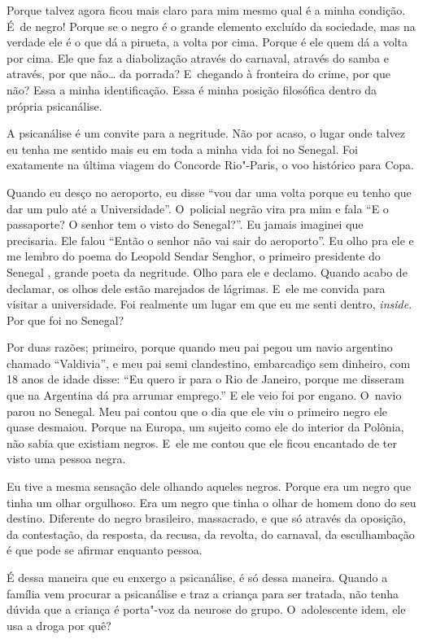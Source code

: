 Porque talvez agora ficou mais claro para mim mesmo qual é a minha
condição. É~de negro! Porque se o negro é o grande elemento excluído da
sociedade, mas na verdade ele é o que dá a pirueta, a volta por cima.
Porque é ele quem dá a volta por cima. Ele que faz a diabolização
através do carnaval, através do samba e através, por que não… da
porrada? E~chegando à fronteira do crime, por que não? Essa a minha
identificação. Essa é minha posição filosófica dentro da própria
psicanálise.

A psicanálise é um convite para a negritude. Não por acaso, o lugar onde
talvez eu tenha me sentido mais eu em toda a minha vida foi no Senegal.
Foi exatamente na última viagem do Concorde Rio"-Paris, o voo histórico
para Copa.

Quando eu desço no aeroporto, eu disse ``vou dar uma volta porque eu tenho
que dar um pulo até a Universidade''. O~policial negrão vira pra mim e
fala ``E o passaporte? O senhor tem o visto do Senegal?''. Eu jamais
imaginei que precisaria. Ele falou ``Então o senhor não vai sair do
aeroporto''. Eu olho pra ele e me lembro do poema do Leopold Sendar
Senghor, o primeiro presidente do Senegal , grande poeta da negritude.
Olho para ele e declamo. Quando acabo de declamar, os olhos dele estão
marejados de lágrimas. E~ele me convida para visitar a universidade. Foi
realmente um lugar em que eu me senti dentro, \emph{inside}. Por que foi
no Senegal?

Por duas razões; primeiro, porque quando meu pai pegou um navio
argentino chamado ``Valdivia'', e meu pai semi clandestino, embarcadiço
sem dinheiro, com 18 anos de idade disse: ``Eu quero ir para o Rio de
Janeiro, porque me disseram que na Argentina dá pra arrumar emprego.'' E
ele veio foi por engano. O~navio parou no Senegal. Meu pai contou que o
dia que ele viu o primeiro negro ele quase desmaiou. Porque na Europa,
um sujeito como ele do interior da Polônia, não sabia que existiam
negros. E~ele me contou que ele ficou encantado de ter visto uma pessoa
negra.

Eu tive a mesma sensação dele olhando aqueles negros. Porque era um
negro que tinha um olhar orgulhoso. Era um negro que tinha o olhar de
homem dono do seu destino. Diferente do negro brasileiro, massacrado, e
que só através da oposição, da contestação, da resposta, da recusa, da
revolta, do carnaval, da esculhambação é que pode se afirmar enquanto
pessoa.

É dessa maneira que eu enxergo a psicanálise, é só dessa maneira. Quando
a família vem procurar a psicanálise e traz a criança para ser tratada,
não tenha dúvida que a criança é porta"-voz da neurose do grupo. O~adolescente idem, ele usa a droga por quê?

